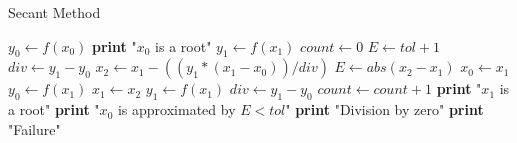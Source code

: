 \documentclass{article}
\begin{document}
  \begin{algorithm}
    \caption{Secant Method}
    \begin{algorithmic}[1]
        \State $y_{0} \gets f(x_{0})$
          \State \textbf{print} "$x_{0}$ is a root"
        \Else
          \State $y_{1} \gets f(x_{1})$
          \State $count \gets 0$
          \State $E \gets tol + 1$
          \State $div \gets y_{1} - y_{0}$
            \State $x_{2} \gets x_{1} - ((y_{1} * (x_{1} - x_{0})) / div)$
            \State $E \gets abs(x_{2} - x_{1})$
            \State $x_{0} \gets x_{1}$
            \State $y_{0} \gets f(x_{1})$
            \State $x_{1} \gets x_{2}$
            \State $y_{1} \gets f(x_{1})$
            \State $div \gets y_{1} - y_{0}$
            \State $count \gets count + 1$
          \EndWhile
            \State \textbf{print} "$x_{1}$ is a root"
            \State \textbf{print} "$x_{0}$ is approximated by $E < tol$"
            \State \textbf{print} "Division by zero"
          \Else
            \State \textbf{print} "Failure"
          \EndIf
        \EndIf
      \EndProcedure
    \end{algorithmic}
  \end{algorithm}
\end{document}
